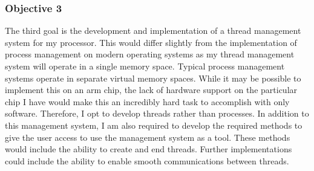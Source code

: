 \subsubsection{Objective 3}
The third goal is the development and implementation of a thread management system for my processor. This would differ slightly from the implementation of process management on modern operating systems as my thread management system will operate in a single memory space. Typical process management systems operate in separate virtual memory spaces. While it may be possible to implement this on an arm chip, the lack of hardware support on the particular chip I have would make this an incredibly hard task to accomplish with only software. Therefore, I opt to develop threads rather than processes. In addition to this management system, I am also required to develop the required methods to give the user access to use the management system as a tool. These methods would include the ability to create and end threads. Further implementations could include the ability to enable smooth communications between threads. 